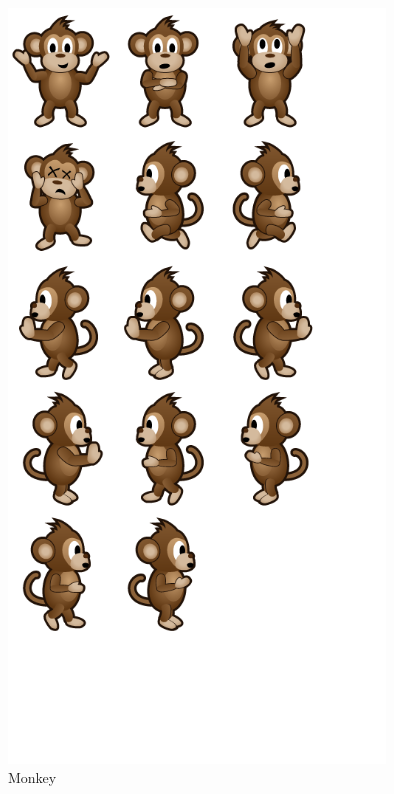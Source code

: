 \documentclass[12pt]{article}
\begin{document}
\begin{figure}[H]
        \centering
        \includegraphics[width=100mm]{monkey.png}
        \caption{Monkey}
        \label{mo}
\end{figure}
\end{document}

